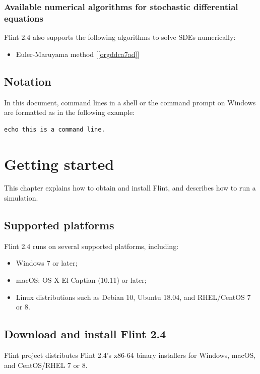 \documentclass[a4paper,10pt]{report}
\begin{document}
\subsection{Available numerical algorithms for stochastic differential equations}
\label{sec:org09d818e}
Flint 2.4 also supports the following algorithms to solve SDEs
numerically:

\begin{itemize}
\item Euler-Maruyama method [\ref{orgddca7ad}]
\end{itemize}


\section{Notation}
\label{sec:org744a0a0}
In this document, command lines in a shell or the command prompt on Windows are
formatted as in the following example:
\begin{verbatim}
echo this is a command line.
\end{verbatim}


\chapter{Getting started}
\label{sec:orgfd3ead1}

This chapter explains how to obtain and install Flint, and describes how to run
a simulation.

\section{Supported platforms}
\label{sec:org4995625}
Flint 2.4 runs on several supported platforms, including:

\begin{itemize}
\item Windows 7 or later;
\item macOS: OS X El Captian (10.11) or later;
\item Linux distributions such as Debian 10, Ubuntu 18.04, and RHEL/CentOS 7 or 8.
\end{itemize}


\section{Download and install Flint 2.4}
\label{sec:org8e8297a}
Flint project distributes Flint 2.4's x86-64 binary installers for Windows,
macOS, and CentOS/RHEL 7 or 8.
\end{document}
